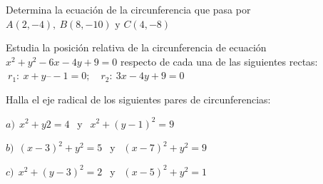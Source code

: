 \begin{mipropuesto}

Determina la ecuación de la circunferencia que pasa por $A(2, - 4),\  B(8, -10) \text{ y } C(4, -8)$ 
	
\end{mipropuesto}

\vspace{-6mm}
\begin{flushright}
\begin{footnotesize} \textcolor{gris}{}	\end{footnotesize}
\end{flushright}

\begin{mipropuesto}

Estudia la posición relativa de la circunferencia de ecuación $x^2 + y^2 - 6x - 4y + 9 = 0$ respecto de cada una de las siguientes rectas: $\ r_1: \ x + y –-1 = 0 ;\quad r_2:\  3x - 4y + 9 = 0$
	
\end{mipropuesto}

\vspace{-6mm}
\begin{flushright}
\begin{footnotesize} \textcolor{gris}{}	\end{footnotesize}
\end{flushright}

\begin{mipropuesto}

Halla el eje radical de los siguientes pares de circunferencias: 

\vspace{2mm} \hspace{1cm} $a)\  \ x^2 + y2 = 4\ \ $ y $\ \ x^2 + ( y - 1)^2 = 9$

\vspace{1mm} \hspace{1cm} $b)\  \ (x - 3)^2 + y^2 = 5 \ \ $  y $\ \ (x -7)^2 + y^2 = 9$

\vspace{1mm} \hspace{1cm} $c)\ \ x^2 + ( y - 3)^2 = 2\ \ $ y $\ \ (x -5)^2 + y^2 = 1$ 
	
\end{mipropuesto}

\vspace{-6mm}
\begin{flushright}
\begin{footnotesize} \textcolor{gris}{}	\end{footnotesize}
\end{flushright}


